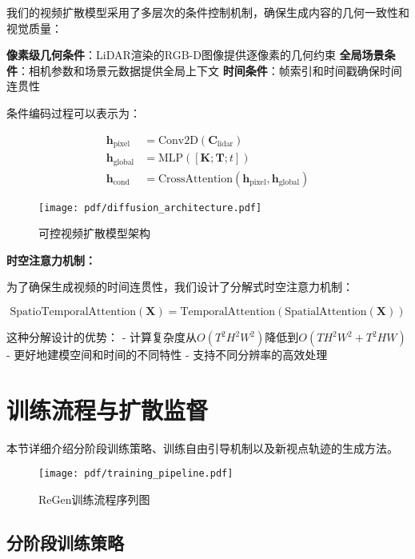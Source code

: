 我们的视频扩散模型采用了多层次的条件控制机制，确保生成内容的几何一致性和视觉质量：

\textbf{像素级几何条件}：LiDAR渲染的RGB-D图像提供逐像素的几何约束
\textbf{全局场景条件}：相机参数和场景元数据提供全局上下文
\textbf{时间条件}：帧索引和时间戳确保时间连贯性

条件编码过程可以表示为：

\begin{align}
\mathbf{h}_{\text{pixel}} &= \text{Conv2D}(\mathbf{C}_{\text{lidar}}) \\
\mathbf{h}_{\text{global}} &= \text{MLP}([\mathbf{K}; \mathbf{T}; t]) \\
\mathbf{h}_{\text{cond}} &= \text{CrossAttention}(\mathbf{h}_{\text{pixel}}, \mathbf{h}_{\text{global}})
\label{eq:condition_encoding_multilevel}
\end{align}

\begin{figure}[htbp]
  \centering
  \texttt{[image: pdf/diffusion\_architecture.pdf]}
  \caption{可控视频扩散模型架构}
  \label{fig:diffusion-architecture}
\end{figure}

\textbf{时空注意力机制：}

为了确保生成视频的时间连贯性，我们设计了分解式时空注意力机制：

\begin{equation}
\text{SpatioTemporalAttention}(\mathbf{X}) = \text{TemporalAttention}(\text{SpatialAttention}(\mathbf{X}))
\label{eq:factorized_attention}
\end{equation}

这种分解设计的优势：
- 计算复杂度从$O(T^2H^2W^2)$降低到$O(TH^2W^2 + T^2HW)$
- 更好地建模空间和时间的不同特性
- 支持不同分辨率的高效处理

\section{训练流程与扩散监督}

本节详细介绍分阶段训练策略、训练自由引导机制以及新视点轨迹的生成方法。

\begin{figure}[htbp]
  \centering
  \texttt{[image: pdf/training\_pipeline.pdf]}
  \caption{ReGen训练流程序列图}
  \label{fig:training-pipeline}
\end{figure}

\subsection{分阶段训练策略}

